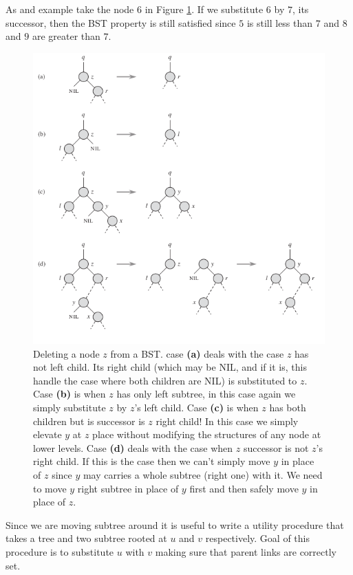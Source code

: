 As and example take the node $6$ in Figure \ref{fig:insertion}. If we substitute $6$ by $7$, its successor, then the BST property is still satisfied since $5$ is still less than $7$ and $8$ and $9$ are greater than $7$.

\begin{figure}
	\label{fig:insertion}
	\centering
		\includegraphics[scale=0.7]{../images/bstdelete}
\caption{Deleting a node $z$ from a BST. case \textbf{(a)} deals with the case $z$ has not left child. Its right child (which may be NIL, and if it is, this handle the case where both children are NIL) is substituted to $z$. Case \textbf{(b)} is when $z$ has only left subtree, in this case again we simply substitute $z$ by $z$'s left child. Case \textbf{(c)} is when $z$ has both children  but is successor is $z$ right child! In this case we simply elevate $y$ at $z$ place without modifying the structures of any node at lower levels. Case \textbf{(d)} deals with the case when $z$ successor is not $z$'s right child. 
If this is the case then we can't simply move $y$ in place of $z$ since $y$ may carries a whole subtree (right one) with it. We need to move $y$ right subtree in place of $y$ first and then safely move $y$ in place of $z$. }
	\end{figure}

Since we are moving subtree around it is useful to write a utility procedure that takes a tree and two subtree rooted at $u$ and $v$ respectively. Goal of this procedure is to substitute $u$ with $v$ making sure that parent links are correctly set.

